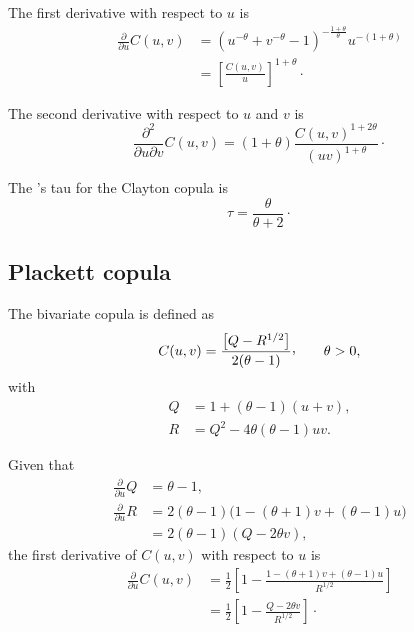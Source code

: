 \documentclass{article}
\def\ccom{\raisebox{.45ex}{\textrm{,}}}
\begin{document}
The first derivative with respect to $u$ is 
\begin{align}
    \frac{\partial}{\partial u}C(u,v)
    &=\left(u^{-\theta} + v^{-\theta} - 1\right)^{-\frac{1+\theta}\theta}
        u^{-(1+\theta)}
        \nonumber\\
    \label{eq:CCder1}
    &=\left[\frac{C(u, v)}u\right]^{1+\theta}\cdot
\end{align}

The second derivative with respect to $u$ and $v$ is 
\begin{equation}
    \frac{\partial^2}{\partial u\partial v}C(u,v)
        = (1+\theta) \frac{
            C(u, v)^{1+2\theta}
        }{
            (uv)^{1+\theta}
        }\cdot
\end{equation}

The \cite{Kendall38}'s tau for the Clayton copula is
\begin{equation}
    \tau = \frac\theta{\theta+2}\cdot
\end{equation}


\subsection*{Plackett copula}
The bivariate \cite{Plackett65} copula is defined as
\begin{equation}
    C(u,v)= \frac{
        \left[ Q - R^{1/2} \right]
    }{
        2 (\theta - 1)
    }\ccom \qquad \theta > 0,
\end{equation}
with
\begin{align}
    Q &= 1 +(\theta-1)(u+v),
        \nonumber\\
    R &= Q^2 - 4 \theta(\theta-1)uv.
\end{align}

Given that
\begin{align}
    \frac{\partial}{\partial u} Q &= \theta - 1,\\
    \frac{\partial}{\partial u} R &= 2(\theta-1) \Big(
        1 - (\theta+1) v + (\theta-1) u
    \Big) \nonumber \\
        &= 2 (\theta - 1) (Q - 2 \theta v),
\end{align}
the first derivative of $C(u, v)$ with respect to $u$ is 
\begin{align}
    \frac{\partial}{\partial u}C(u,v)
    &=\frac12\left[1-\frac{
        1 - (\theta+1) v + (\theta-1) u
    }{R^{1/2}}\right]
        \nonumber\\
    &=\frac12\left[1-\frac{
        Q - 2\theta v
    }{R^{1/2}}\right]\cdot
\end{align}
\end{document}
